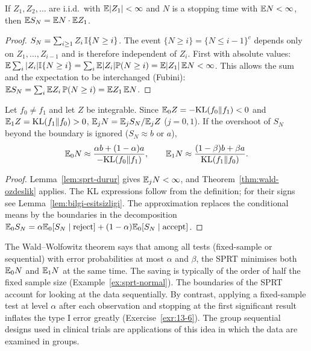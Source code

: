 \documentclass[main.tex]{subfiles}
\begin{document}
\begin{theorem}\label{thm:wald-ozdeslik}
If $Z_1,Z_2,\dots$ are i.i.d.\ with $\mathbb{E}|Z_1|<\infty$ and $N$ is a stopping time with $\mathbb{E} N<\infty$, then $\mathbb{E} S_N=\mathbb{E} N\cdot\mathbb{E} Z_1$.
\end{theorem}
\begin{proof}
$S_N=\sum_{i\ge1}Z_i\,\mathbb{I}\{N\ge i\}$. The event $\{N\ge i\}=\{N\le i-1\}^c$ depends only on $Z_1,\dots,Z_{i-1}$ and is therefore independent of $Z_i$. First with absolute values: $\mathbb{E}\sum_i|Z_i|\mathbb{I}\{N\ge i\}=\sum_i\mathbb{E}|Z_i|\mathbb{P}(N\ge i)=\mathbb{E}|Z_1|\,\mathbb{E} N<\infty$. This allows the sum and the expectation to be interchanged (Fubini): $\mathbb{E} S_N=\sum_i\mathbb{E} Z_i\,\mathbb{P}(N\ge i)=\mathbb{E} Z_1\,\mathbb{E} N$.
\end{proof}

\begin{corollary}\label{cor:sprt-asn}
Let $f_0\ne f_1$ and let $Z$ be integrable. Since $\mathbb{E}_0Z=-\mathrm{KL}(f_0\|f_1)<0$ and $\mathbb{E}_1Z=\mathrm{KL}(f_1\|f_0)>0$, $\mathbb{E}_jN=\mathbb{E}_jS_N/\mathbb{E}_jZ$ ($j=0,1$). If the overshoot of $S_N$ beyond the boundary is ignored ($S_N\approx b$ or $a$),
\[
\mathbb{E}_0N\approx\frac{\alpha b+(1-\alpha)a}{-\mathrm{KL}(f_0\|f_1)},\qquad\mathbb{E}_1N\approx\frac{(1-\beta)b+\beta a}{\mathrm{KL}(f_1\|f_0)} .
\]
\end{corollary}
\begin{proof}
Lemma~\ref{lem:sprt-durur} gives $\mathbb{E}_jN<\infty$, and Theorem~\ref{thm:wald-ozdeslik} applies. The KL expressions follow from the definition; for their signs see Lemma~\ref{lem:bilgi-esitsizligi}. The approximation replaces the conditional means by the boundaries in the decomposition $\mathbb{E}_0S_N=\alpha\mathbb{E}_0[S_N\mid\text{reject}]+(1-\alpha)\mathbb{E}_0[S_N\mid\text{accept}]$.
\end{proof}

\begin{remark}\label{rem:sprt-optimal}
The Wald--Wolfowitz theorem \cite{wald-wolfowitz48} says that among all tests (fixed-sample or sequential) with error probabilities at most $\alpha$ and $\beta$, the SPRT minimises both $\mathbb{E}_0N$ and $\mathbb{E}_1N$ at the same time. The saving is typically of the order of half the fixed sample size (Example~\ref{ex:sprt-normal}). The boundaries of the SPRT account for looking at the data sequentially. By contrast, applying a fixed-sample test at level $\alpha$ after each observation and stopping at the first significant result inflates the type I error greatly (Exercise~\ref{exr:13-6}). The group sequential designs used in clinical trials are applications of this idea in which the data are examined in groups.
\end{remark}
\end{document}
